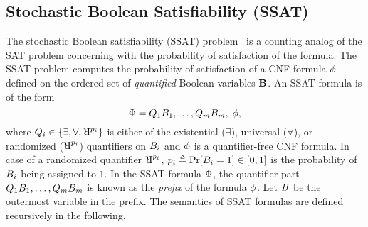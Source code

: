 \subsection{Stochastic Boolean Satisfiability (SSAT)}\label{fairness_justicia_sec:ssat}

The stochastic Boolean satisfiability (SSAT) problem~\cite{littman2001stochastic} is a counting analog of the SAT problem concerning with the probability of satisfaction of the formula. The SSAT problem computes the  probability of satisfaction of a CNF formula $\phi$ defined on the ordered set of \textit{quantified} Boolean variables $ \mathbf{B} $. 
An SSAT formula is of the form
\begin{equation}\label{fairness_justicia_eq:ssat}
	\Phi = Q_1B_1, \dots, Q_m B_m,\; \phi, 
\end{equation}
where $ \varquantifier_i \in \{\exists, \forall, \R^{p_i}\} $ is either of the existential ($\exists$), universal ($\forall$), or randomized ($\R^{p_i}$) quantifiers on $B_i$ and $\phi$ is a quantifier-free CNF formula. In case of a randomized quantifier $ \R^{p_i} $, $ p_i \triangleq \Pr[B_i = 1] \in [0,1] $ is the probability of $ B_i $ being assigned to $ 1 $. In the SSAT formula $ \Phi $, the quantifier part $ Q_1B_1, \dots, Q_m B_m $ is known as the \textit{prefix} of the formula $ \phi $.  Let $ B $ be the outermost variable in the prefix. The semantics of SSAT formulas are defined recursively in the following.

